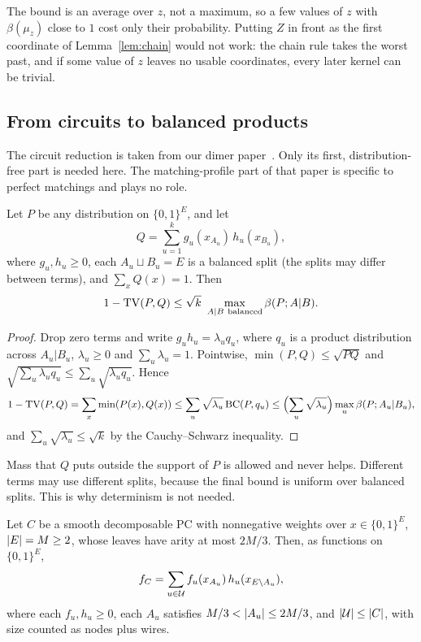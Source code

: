 The bound is an average over $z$, not a maximum, so a few values of $z$ with $\beta(\mu_z)$ close to $1$ cost only their probability. Putting $Z$ in front as the first coordinate of Lemma~\ref{lem:chain} would not work: the chain rule takes the worst past, and if some value of $z$ leaves no usable coordinates, every later kernel can be trivial.

\subsection{From circuits to balanced products}\label{sec:circuits}

The circuit reduction is taken from our dimer paper~\cite[Sec.~7.1--7.2]{Blaschke26Dimers}. Only its first, distribution-free part is needed here. The matching-profile part of that paper is specific to perfect matchings and plays no role.

\begin{lemma}\label{lem:overlap}
Let $P$ be any distribution on $\{0,1\}^E$, and let
\[
  Q=\sum_{u=1}^kg_u(x_{A_u})\,h_u(x_{B_u}),
\]
where $g_u,h_u\ge0$, each $A_u\sqcup B_u=E$ is a balanced split (the splits may differ between terms), and $\sum_xQ(x)=1$. Then
\[
  1-\TV(P,Q)\le\sqrt k\ \max_{A|B\ \mathrm{balanced}}\beta(P;A|B).
\]
\end{lemma}

\begin{proof}
Drop zero terms and write $g_uh_u=\lambda_uq_u$, where $q_u$ is a product distribution across $A_u|B_u$, $\lambda_u\ge0$ and $\sum_u\lambda_u=1$. Pointwise, $\min(P,Q)\le\sqrt{PQ}$ and $\sqrt{\sum_u\lambda_uq_u}\le\sum_u\sqrt{\lambda_uq_u}$. Hence
\[
  1-\mathrm{TV}(P,Q)=\sum_x\min(P(x),Q(x))\le\sum_u\sqrt{\lambda_u}\,\mathrm{BC}(P,q_u)\le\Bigl(\sum_u\sqrt{\lambda_u}\Bigr)\max_u\beta(P;A_u|B_u),
\]
and $\sum_u\sqrt{\lambda_u}\le\sqrt k$ by the Cauchy--Schwarz inequality.
\end{proof}

Mass that $Q$ puts outside the support of $P$ is allowed and never helps. Different terms may use different splits, because the final bound is uniform over balanced splits. This is why determinism is not needed.

\begin{lemma}\label{lem:decomp}
Let $C$ be a smooth decomposable PC with nonnegative weights over $x\in\{0,1\}^E$, $\lvert E\rvert=M\ge2$, whose leaves have arity at most $2M/3$. Then, as functions on $\{0,1\}^E$,
\[
  f_C=\sum_{u\in\mathcal{U}}f_u(x_{A_u})\,h_u(x_{E\setminus A_u}),
\]
where each $f_u,h_u\ge0$, each $A_u$ satisfies $M/3<\lvert A_u\rvert\le2M/3$, and $\lvert \mathcal{U}\rvert\le\lvert C\rvert$, with size counted as nodes plus wires.
\end{lemma}

